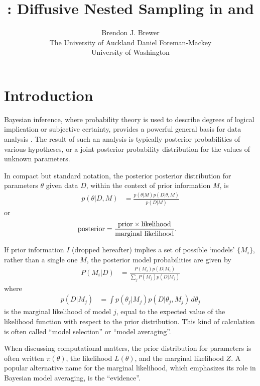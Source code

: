 \documentclass[article]{jss}
\author{Brendon J. Brewer\\The University of Auckland\And 
        Daniel Foreman-Mackey\\University of Washington}
\title{\pkg{DNest4}: Diffusive Nested Sampling in
\proglang{C++} and \proglang{Python}}
\newcommand{\params}{\theta}
\newcommand{\data}{D}
\begin{document}
\maketitle


\section{Introduction}
Bayesian inference, where probability theory is used to describe degrees of
logical implication or subjective certainty, provides a powerful general basis
for data analysis \citep{ohagan, sivia}. The result of such
an analysis is typically
posterior probabilities of various hypotheses, or
a joint posterior probability distribution for the values of unknown
parameters.

In compact but standard notation, the posterior
posterior distribution for parameters $\params$ given data $\data$, within
the context of prior information $M$, is
\begin{align}
p(\params | \data, M) &=
\frac{p(\params | M)p(\data | \params, M)}{p(\data | M)}
\end{align}
or
\begin{align}
\textnormal{posterior} &=
\frac{\textnormal{prior} \times \textnormal{likelihood}}
     {\textnormal{marginal likelihood}}.
\end{align}

If prior information $I$ (dropped hereafter)
implies a set of possible `models' $\{M_i\}$,
rather than a single one $M$, the posterior model probabilities are given by
\begin{align}
P(M_i | \data) &=
\frac{P(M_i)p(\data | M_i)}{\sum_j P(M_j)p(\data | M_j)}
\end{align}
where
\begin{align}
p(\data | M_j) &= \int p(\theta_j | M_j)p(\data | \theta_j, M_j) \, d\theta_j
\end{align}
is the marginal likelihood of model $j$, equal to the expected value of the
likelihood function with respect to the prior distribution.
This kind of calculation is often
called ``model selection'' or ``model averaging''.

When discussing computational matters, the prior distribution for parameters
is
often written $\pi(\theta)$, the likelihood $L(\theta)$,
and the marginal likelihood $Z$. A popular alternative name for the marginal
likelihood, which emphasizes its role in Bayesian model averaging,
is the ``evidence''.
\end{document}
